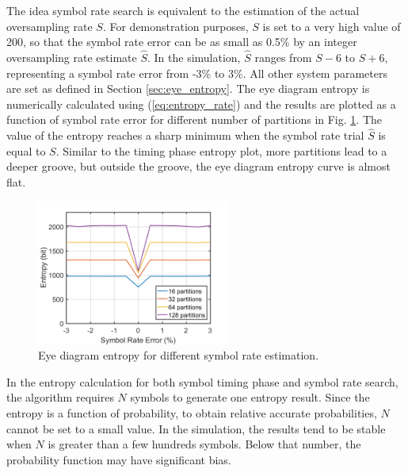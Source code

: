 \documentclass[journal,comsoc]{IEEEtran}
\begin{document}


The idea symbol rate search is equivalent to the estimation of the actual oversampling rate \(S\).
For demonstration purposes, \(S\) is set to a very high value of 200, so that the symbol rate  error can be as small as 0.5\% by an integer  oversampling rate estimate \(\hat S\).
In the simulation, \(\hat S\) ranges from  \(S-6\) to  \(S+6\), representing a symbol rate error from -3\% to 3\%.
All other system parameters are set as defined in Section \ref{sec:eye_entropy}. 
The eye diagram entropy is numerically calculated using (\ref{eq:entropy_rate}) and the results are plotted as a function of symbol rate error for different number of partitions in Fig. \ref{fig:rate_entropy}.
The value of the entropy reaches a sharp minimum when the symbol rate trial \(\hat S\) is equal to \(S\).
Similar to the timing phase entropy plot, more partitions lead to a deeper groove, but outside the groove, the eye diagram entropy curve is almost flat.

\begin{figure}[htbp]
\centering
\includegraphics[width=2.5in]{rate_entropy.png}
\caption{Eye diagram entropy for different symbol rate estimation.}
\label{fig:rate_entropy} 
\end{figure}
In the entropy calculation for both symbol timing phase and symbol rate search, 
the algorithm requires \(N\) symbols to generate one entropy result.
Since the entropy is a function of probability, to obtain relative accurate probabilities, \(N\) cannot be set to a small value.
In the simulation, the results tend to be stable when \(N\) is greater than a few hundreds symbols.
Below that number, the probability function may have significant bias.
\end{document}

